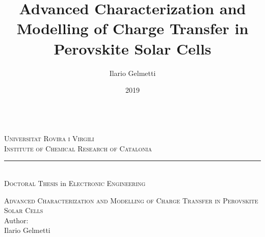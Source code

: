 \documentclass[b5paper, 12pt, openany, twoside, titlepage]{book} %
\title{Advanced Characterization and Modelling of Charge Transfer in Perovskite Solar Cells}
\author{Ilario Gelmetti}
\date{2019}
\begin{document}
\pagestyle{plain}
\graphicspath{ {../contents_img/titlepage/} }

%

\phantom{Ciao Mamma!}\thispagestyle{empty}\newpage
\phantom{Ciao Mamma!}\thispagestyle{empty}\newpage
\phantom{Ciao Mamma!}\thispagestyle{empty}\newpage

\begin{titlepage}\begin{center}



		\\%
		\bigskip
		\large{\textsc{Universitat Rovira i Virgili\\ Institute of Chemical Research of Catalonia}}\\
		\rule{5cm}{1pt}\\
		{
		\bigskip
		{\textsc{Doctoral Thesis} in \textsc{Electronic Engineering}}}\\
		\bigskip\bigskip\vfill

		\huge{\textsc{Advanced Characterization and Modelling of Charge Transfer in Perovskite Solar Cells}}\\
		\bigskip\bigskip\vfill
		\footnotesize{Author:}\\
		\large{Ilario Gelmetti}\\
		\makebox[.2\textwidth]{\rule{0pt}{.02\textheight}}\\
	\end{center}
	\begin{small}
\end{small}
\end{titlepage}
\end{document}
